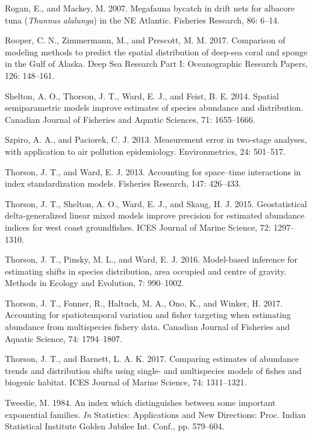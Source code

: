 \documentclass[]{article}
\begin{document}
\hypertarget{ref-rogan2007}{}
Rogan, E., and Mackey, M. 2007. Megafauna bycatch in drift nets for
albacore tuna (\emph{Thunnus alalunga}) in the NE Atlantic. Fisheries
Research, 86: 6--14.

\hypertarget{ref-rooper2017}{}
Rooper, C. N., Zimmermann, M., and Prescott, M. M. 2017. Comparison of
modeling methods to predict the spatial distribution of deep-sea coral
and sponge in the Gulf of Alaska. Deep Sea Research Part I:
Oceanographic Research Papers, 126: 148--161.

\hypertarget{ref-shelton2014}{}
Shelton, A. O., Thorson, J. T., Ward, E. J., and Feist, B. E. 2014.
Spatial semiparametric models improve estimates of species abundance and
distribution. Canadian Journal of Fisheries and Aquatic Sciences, 71:
1655--1666.

\hypertarget{ref-szpiro2013}{}
Szpiro, A. A., and Paciorek, C. J. 2013. Measurement error in two-stage
analyses, with application to air pollution epidemiology.
Environmetrics, 24: 501--517.

\hypertarget{ref-thorson2013}{}
Thorson, J. T., and Ward, E. J. 2013. Accounting for space--time
interactions in index standardization models. Fisheries Research, 147:
426--433.

\hypertarget{ref-thorson2015}{}
Thorson, J. T., Shelton, A. O., Ward, E. J., and Skaug, H. J. 2015.
Geostatistical delta-generalized linear mixed models improve precision
for estimated abundance indices for west coast groundfishes. ICES
Journal of Marine Science, 72: 1297--1310.

\hypertarget{ref-thorson2016}{}
Thorson, J. T., Pinsky, M. L., and Ward, E. J. 2016. Model-based
inference for estimating shifts in species distribution, area occupied
and centre of gravity. Methods in Ecology and Evolution, 7: 990--1002.

\hypertarget{ref-thorson2017}{}
Thorson, J. T., Fonner, R., Haltuch, M. A., Ono, K., and Winker, H.
2017. Accounting for spatiotemporal variation and fisher targeting when
estimating abundance from multispecies fishery data. Canadian Journal of
Fisheries and Aquatic Science, 74: 1794--1807.

\hypertarget{ref-thorson2017vast}{}
Thorson, J. T., and Barnett, L. A. K. 2017. Comparing estimates of
abundance trends and distribution shifts using single- and multispecies
models of fishes and biogenic habitat. ICES Journal of Marine Science,
74: 1311--1321.

\hypertarget{ref-tweedie1984}{}
Tweedie, M. 1984. An index which distinguishes between some important
exponential families. \emph{In} Statistics: Applications and New
Directions: Proc. Indian Statistical Institute Golden Jubilee Int.
Conf., pp. 579--604.
\end{document}
